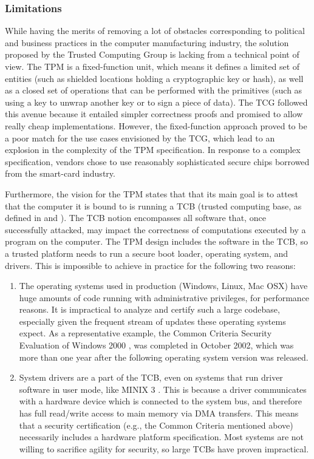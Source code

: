 \subsubsection{Limitations}
While having the merits of removing a lot of obstacles corresponding to
political and business practices in the computer manufacturing industry, the
solution proposed by the Trusted Computing Group is lacking from a technical
point of view. The TPM is a fixed-function unit, which means it defines a
limited set of entities (such as shielded locations holding a cryptographic key
or hash), as well as a closed set of operations that can be performed with the
primitives (such as using a key to unwrap another key or to sign a piece of
data). The TCG followed this avenue because it entailed simpler correctness
proofs and promised to allow really cheap implementations. However, the
fixed-function approach proved to be a poor match for the use cases envisioned
by the TCG, which lead to an explosion in the complexity of the TPM
specification. In response to a complex specification, vendors chose to use
reasonably sophisticated secure chips borrowed from the smart-card industry.

Furthermore, the vision for the TPM states that that its main goal is to attest
that the computer it is bound to is running a TCB (trusted computing base, as
defined in \cite{latham1985ddt} and \cite{lampson:ads}). The TCB notion
encompasses all software that, once successfully attacked, may impact the
correctness of computations executed by a program on the computer. The TPM
design includes the software in the TCB, so a trusted platform needs to run a
secure boot loader, operating system, and drivers. This is impossible to
achieve in practice for the following two reasons:

\begin{enumerate}
  \item The operating systems used in production (Windows, Linux, Mac OSX) have
  huge amounts of code running with administrative privileges, for performance
  reasons. It is impractical to analyze and certify such a large codebase,
  especially given the frequent stream of updates these operating systems
  expect. As a representative example, the Common Criteria Security Evaluation
  of Windows 2000 \cite{microsoft2002eal}, \cite{shapiro2003uwe} was completed
  in October 2002, which was more than one year after the following operating system version was released.
  \item System drivers are a part of the TCB, even on systems that run driver
  software in user mode, like MINIX 3 \cite{herder2006msp}. This is
  because a driver communicates with a hardware device which is connected to
  the system bus, and therefore has full read/write access to main memory via
  DMA transfers. This means that a security certification (e.g., the Common
  Criteria mentioned above) necessarily includes a hardware platform
  specification. Most systems are not willing to sacrifice agility for
  security, so large TCBs have proven impractical.
\end{enumerate}

